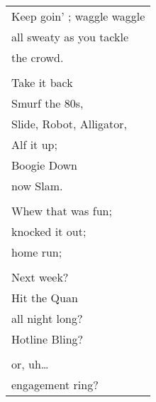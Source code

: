 \documentclass{article}
\begin{document}
\begin{center}
\begin{tabular}{l}
Keep goin' ; waggle waggle \\
all sweaty as you tackle \\
the crowd. \\
\\
Take it back \\
Smurf the 80s, \\
Slide, Robot, Alligator, \\
Alf it up; \\
Boogie Down \\
now Slam. \\
\\
Whew that was fun; \\
knocked it out; \\
home run; \\
\\
Next week? \\
Hit the Quan \\
all night long? \\
Hotline Bling? \\
\\
or, uh\ldots{} \\
engagement ring? \\
\end{tabular}
\end{center}
\end{document}
